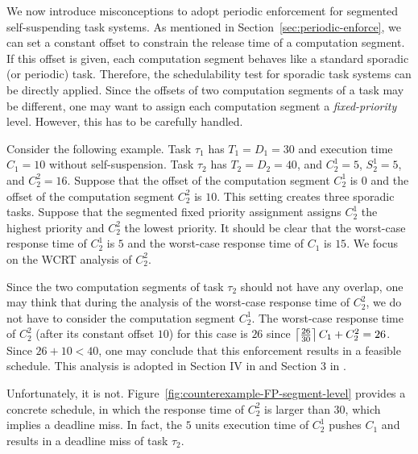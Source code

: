 We now introduce misconceptions to adopt periodic enforcement for segmented self-suspending task systems. As mentioned in Section~\ref{sec:periodic-enforce}, we can set a constant offset to constrain the release time of a computation segment. If this offset is given, each computation segment behaves like a standard sporadic (or periodic) task. Therefore, the schedulability test for sporadic task systems can be directly applied. Since the offsets of two computation segments of a task may be different, one may want to assign each computation segment a \emph{fixed-priority} level.  However, this has to be carefully handled. 

Consider the following example. Task $\tau_1$ has $T_1=D_1=30$ and execution time $C_1=10$ without self-suspension. Task $\tau_2$ has $T_2=D_2=40$, and $C_2^1=5$, $S_2^1=5$, and $C_2^2=16$. Suppose that the offset of the computation segment $C_2^1$ is $0$ and the offset of the computation segment $C_2^2$ is $10$. This setting creates three sporadic tasks.
Suppose that the segmented fixed priority assignment assigns $C_2^1$ the highest priority and $C_2^2$ the lowest priority. It should be clear that the worst-case response time of $C_2^1$ is $5$ and the worst-case response time of $C_1$ is $15$. We focus on the WCRT analysis of $C_2^2$.


Since the two computation segments of task $\tau_2$ should not have any overlap, one may think that during the analysis of the worst-case response time of $C_2^2$, we do not have to consider the computation segment $C_2^1$. The worst-case response time of $C_2^2$ (after its constant offset $10$) for this case is $26$ since $\left\lceil{\frac{26}{30}}\right\rceil C_1 + C_2^2 = 26$. 
Since $26+10 < 40$, one may conclude that this enforcement results in a feasible schedule. This analysis is adopted in Section IV in \cite{RTSS-KimANR13} and Section 3 in \cite{DBLP:journals/ieicet/DingTT09}. 

Unfortunately, it is not. Figure~\ref{fig:counterexample-FP-segment-level} provides a concrete schedule, in which the response time of $C_2^2$ is larger than $30$, which implies a deadline miss. In fact, the $5$ units execution time of $C_2^1$ pushes $C_1$ and results in a deadline miss of task $\tau_2$.


